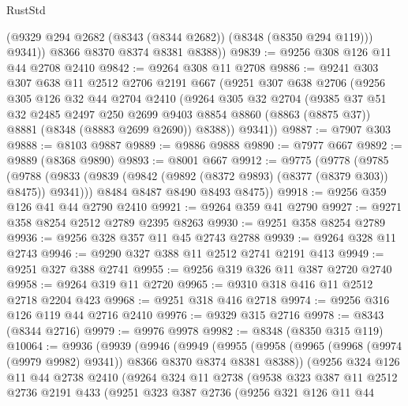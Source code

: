 \begin{lexlean}{RustStd}
\begin{coremodule}
            (@9329 @294 @2682 (@8343 (@8344 @2682)) (@8348 (@8350 @294 @119)))
            @9341))
        @8366
        @8370
        @8374
        @8381
        @8388))
@9839 := @9256 @308 @126 @11 @44 @2708 @2410
@9842 := @9264 @308 @11 @2708
@9886 := @9241
    @303
    @307
    @638
    @11
    @2512
    @2706
    @2191
    @667
    (@9251
      @307
      @638
      @2706
      (@9256
        @305
        @126
        @32
        @44
        @2704
        @2410
        (@9264
          @305
          @32
          @2704
          (@9385
            @37
            @51
            @32
            @2485
            @2497
            @250
            @2699
            @9403
            @8854
            @8860
            (@8863 (@8875 @37))
            @8881
            (@8348 (@8883 @2699 @2690))
            @8388))
        @9341))
@9887 := @7907 @303
@9888 := @8103 @9887
@9889 := @9886 @9888
@9890 := @7977 @667
@9892 := @9889 (@8368 @9890)
@9893 := @8001 @667
@9912 := @9775
    (@9778
      (@9785
        (@9788 (@9833 (@9839 (@9842 (@9892 (@8372 @9893) (@8377 (@8379 @303)) @8475)) @9341)))
        @8484
        @8487
        @8490
        @8493
        @8475))
@9918 := @9256 @359 @126 @41 @44 @2790 @2410
@9921 := @9264 @359 @41 @2790
@9927 := @9271 @358 @8254 @2512 @2789 @2395 @8263
@9930 := @9251 @358 @8254 @2789
@9936 := @9256 @328 @357 @11 @45 @2743 @2788
@9939 := @9264 @328 @11 @2743
@9946 := @9290 @327 @388 @11 @2512 @2741 @2191 @413
@9949 := @9251 @327 @388 @2741
@9955 := @9256 @319 @326 @11 @387 @2720 @2740
@9958 := @9264 @319 @11 @2720
@9965 := @9310 @318 @416 @11 @2512 @2718 @2204 @423
@9968 := @9251 @318 @416 @2718
@9974 := @9256 @316 @126 @119 @44 @2716 @2410
@9976 := @9329 @315 @2716
@9978 := @8343 (@8344 @2716)
@9979 := @9976 @9978
@9982 := @8348 (@8350 @315 @119)
@10064 := @9936
    (@9939
      (@9946
        (@9949
          (@9955
            (@9958 (@9965 (@9968 (@9974 (@9979 @9982) @9341)) @8366 @8370 @8374 @8381 @8388))
            (@9256
              @324
              @126
              @11
              @44
              @2738
              @2410
              (@9264
                @324
                @11
                @2738
                (@9538
                  @323
                  @387
                  @11
                  @2512
                  @2736
                  @2191
                  @433
                  (@9251
                    @323
                    @387
                    @2736
                    (@9256
                      @321
                      @126
                      @11
                      @44

\end{coremodule}
\end{lexlean}
